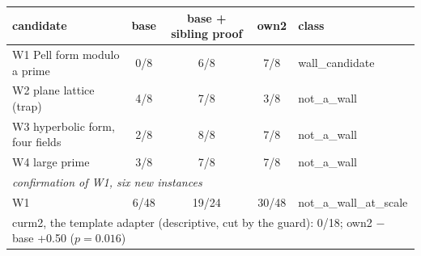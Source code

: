 \begin{tabular}{lcccl}
\toprule
candidate & base & base + sibling proof & own2 & class \\
\midrule
W1 Pell form modulo a prime & 0/8 & 6/8 & 7/8 & wall\_candidate \\
W2 plane lattice (trap) & 4/8 & 7/8 & 3/8 & not\_a\_wall \\
W3 hyperbolic form, four fields & 2/8 & 8/8 & 7/8 & not\_a\_wall \\
W4 large prime & 3/8 & 7/8 & 7/8 & not\_a\_wall \\
\midrule
\multicolumn{5}{l}{\emph{confirmation of W1, six new instances}} \\
W1 & 6/48 & 19/24 & 30/48 & not\_a\_wall\_at\_scale \\
\multicolumn{5}{l}{curm2, the template adapter (descriptive, cut by the guard): 0/18; own2 $-$ base +0.50 ($p=0.016$)} \\
\bottomrule
\end{tabular}
